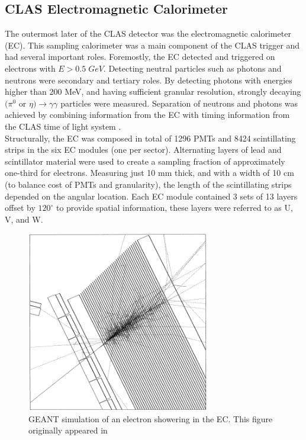 \subsection{CLAS Electromagnetic Calorimeter}
The outermost later of the CLAS detector was the electromagnetic calorimeter (EC).  This sampling calorimeter was a main component of the CLAS trigger and had several important roles.  Foremostly, the EC detected and triggered on electrons with $E > 0.5 \; GeV$.  Detecting neutral particles such as photons and neutrons were secondary and tertiary roles.  By detecting photons with energies higher than 200 MeV, and having sufficient granular resolution, strongly decaying $(\pi^0$ or $\eta) \rightarrow \gamma \gamma$ particles were measured.  Separation of neutrons and photons was achieved by combining information from the EC with timing information from the CLAS time of light system \cite{hardware-amarian:2001}.  \\
Structurally, the EC was composed in total of 1296 PMTs and 8424 scintillating strips in the six EC modules (one per sector).  Alternating layers of lead and scintillator material were used to create a sampling fraction of approximately one-third for electrons.  Measuring just 10 mm thick, and with a width of 10 cm (to balance cost of PMTs and granularity), the length of the scintillating strips depended on the angular location.  Each EC module contained 3 sets of 13 layers offset by $120^\circ$ to provide spatial information, these layers were referred to as U, V, and W.  

\begin{figure}
	\centering
		\includegraphics[width=8cm]{image/diagrams/ec-shower-geant.png}
		\caption{GEANT simulation of an electron showering in the EC.  This figure originally appeared in \cite{hardware-amarian:2001}}
\end{figure}
